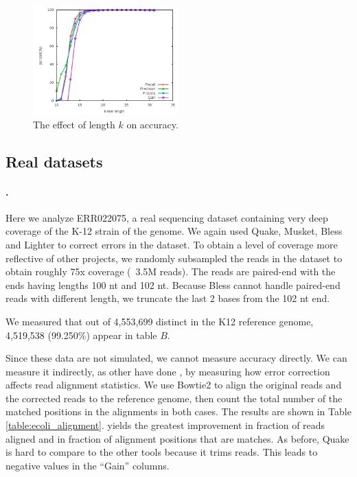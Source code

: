 \documentclass[10pt]{article}
\begin{document}
\begin{figure}[h!]
\begin{center}
\includegraphics[width=0.5\textwidth]{kmerLength.jpg}
\caption{The effect of \kmer length $k$ on accuracy.\label{fig:kmerLength}}
\end{center}
\end{figure}


\subsection*{Real datasets}
\paragraph{\ecoli.}  Here we analyze ERR022075, a real sequencing dataset containing very deep coverage of the K-12 strain of the \ecoli genome.  We again used Quake, Musket, Bless and Lighter to correct errors in the dataset.
To obtain a level of coverage more reflective of other projects, we randomly subsampled the reads in the dataset to obtain roughly 75x coverage (~3.5M reads).  The reads are paired-end with the ends having lengths 100 nt and 102 nt.  Because Bless cannot handle paired-end reads with different length, we truncate the last 2 bases from the 102 nt end.

We measured that out of 4,553,699 distinct \kmers in the \ecoli K12 reference genome, 4,519,538 (99.250\%) appear in table $B$. 
 
Since these data are not simulated, we cannot measure accuracy directly.  We can measure it indirectly, as other have done \cite{heo2014bless}, by measuring how error correction affects read alignment statistics.  We use Bowtie2 \cite{langmead2012fast} to align the original reads and the corrected reads to the reference genome, then count the total number of the matched positions in the alignments in both cases.  The results are shown in Table \ref{table:ecoli_alignment}.  \tool yields the greatest improvement in fraction of reads aligned and in fraction of alignment positions that are matches.  As before, Quake is hard to compare to the other tools because it trims reads.  This leads to negative values in the ``Gain'' columns.
\end{document}
